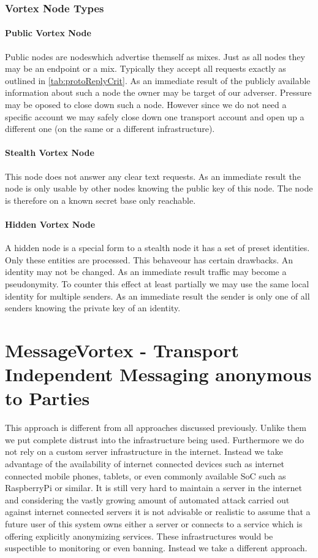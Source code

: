\subsection{Vortex Node Types}

\subsubsection{Public Vortex Node}
Public nodes are nodeswhich advertise themself as mixes. Just as all nodes they may be an endpoint or a mix. Typically they accept all requests exactly as outlined in \ref{tab:protoReplyCrit}. As an immediate result of the publicly available information about such a node the owner may be target of our adverser. Pressure may be oposed to close down such a node. However since we do not need a specific account we may safely close down one transport account and open up a different one (on the same or a different infrastructure).

\subsubsection{Stealth Vortex Node}
This node does not answer any clear text requests. As an immediate result the node is only usable by other nodes knowing the public key of this node. The node is therefore on a known secret base only reachable.

\subsubsection{Hidden Vortex Node}
A hidden node is a special form to a stealth node it has a set of preset identities. Only these entities are processed. This behaveour has certain drawbacks. An identity may not be changed. As an immediate result traffic may become a pseudonymity. To counter this effect at least partially we may use the same local identity for multiple senders. As an immediate result the sender is only one of all senders knowing the private key of an identity.

\chapter{MessageVortex - Transport Independent Messaging anonymous to  Parties}
This approach is different from all approaches discussed previously. Unlike them we put complete distrust into the infrastructure being used. Furthermore we do not rely on a custom server infrastructure in the internet. Instead we take advantage of the availability of internet connected devices such as internet connected mobile phones, tablets, or even commonly available SoC such as RaspberryPi or similar. It is still very hard to maintain a server in the internet and considering the vastly growing amount of automated attack carried out against internet connected servers it is not advisable or realistic to assume that a future user of this system owns either a server or connects to a service which is offering explicitly anonymizing services. These infrastructures would be suspectible to monitoring or even banning. Instead we take a different approach.

